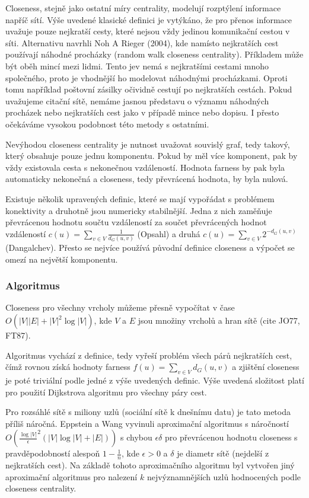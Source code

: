 \documentclass[12pt,titlepage]{report}
\begin{document}
Closeness, stejně jako ostatní míry centrality, modelují rozptýlení informace
napříč sítí. Výše uvedené klasické definici je vytýkáno, že pro přenos
informace uvažuje pouze nejkratší cesty, které nejsou vždy jedinou komunikační
cestou v síti. Alternativu navrhli Noh A Rieger (2004), kde namísto nejkratších
cest používají náhodné procházky (random walk closeness centrality). Příkladem
může být oběh mincí mezi lidmi. Tento jev nemá s nejkratšími cestami mnoho
společného, proto je vhodnější ho modelovat náhodnými procházkami. Oproti tomu
například poštovní zásilky očividně cestují po nejkratších cestách.  Pokud
uvažujeme citační sítě, nemáme jasnou představu o významu náhodných procházek
nebo nejkratších cest jako v případě mince nebo dopisu. I přesto očekáváme
vysokou podobnost této metody s ostatními.

Nevýhodou closeness centrality je nutnost uvažovat souvislý graf, tedy takový,
který obsahuje pouze jednu komponentu. Pokud by měl více komponent, pak by vždy
existovala cesta s nekonečnou vzdáleností. Hodnota farness by pak byla
automaticky nekonečná a closeness, tedy převrácená hodnota, by byla nulová. 

Existuje několik upravených definic, které se mají vypořádat s problémem
konektivity a druhotně jsou numericky stabilnější. Jedna z nich zaměňuje
převrácenou hodnotu součtu vzdáleností za součet převrácených hodnot
vzdáleností $c(u) = \sum_{v \in V} \frac{1}{d_G(u, v)}$ (Opsahl) a druhá $c(u)
= \sum_{v \in V} 2^{-d_G(u, v)}$ (Dangalchev). Přesto se nejvíce používá
původní definice closeness a výpočet se omezí na největší komponentu.



\subsubsection{Algoritmus}
Closeness pro všechny vrcholy můžeme přesně vypočítat v čase $O(|V||E| +
|V|^2\log|V|)$, kde $V$ a $E$ jsou množiny vrcholů a hran sítě (cite JO77,
FT87). 

Algoritmus vychází z definice, tedy vyřeší problém všech párů nejkratších cest,
čímž rovnou získá hodnoty farness $f(u) = \sum_{v \in V} d_G(u, v)$ a zjištění
closeness je poté triviální podle jedné z výše uvedených definic.  Výše uvedená
složitost platí pro použití Dijkstrova algoritmu pro všechny páry cest.

Pro rozsáhlé sítě s miliony uzlů (sociální sítě k dnešnímu datu) je tato
metoda příliš náročná. Eppstein a Wang vyvinuli aproximační algoritmus s
náročností $O(\frac{\log|V|}{\epsilon}^2 (|V| \log |V| + |E|))$ s chybou
$\epsilon \delta$ pro převrácenou hodnotu closeness s pravděpodobností alespoň
$1 - \frac{1}{n}$, kde $\epsilon > 0$ a $\delta$ je diametr sítě (nejdelší z
nejkratších cest). Na základě tohoto aproximačního algoritmu byl vytvořen jiný
aproximační algoritmus pro nalezení $k$ nejvýznamnějších uzlů hodnocených podle
closeness centrality.
\end{document}
